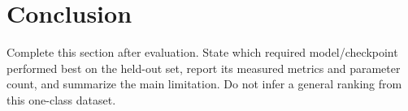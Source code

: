 \documentclass[conference]{IEEEtran}
\begin{document}
\section{Conclusion}
Complete this section after evaluation. State which required model/checkpoint performed best on the held-out set, report its measured metrics and parameter count, and summarize the main limitation. Do not infer a general ranking from this one-class dataset.



\end{document}
